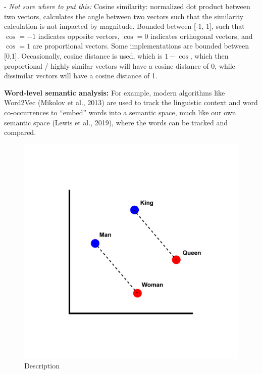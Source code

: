 - \textit{Not sure where to put this:} Cosine similarity: normalized dot product between two vectors, calculates the angle between two vectors such that the similarity calculation is not impacted by magnitude. Bounded between [-1, 1], such that $\cos = -1$ indicates opposite vectors, $\cos = 0$ indicates orthogonal vectors, and $\cos = 1$ are proportional vectors. Some implementations are bounded between [0,1]. Occasionally, cosine distance is used, which is $1 - \cos$, which then proportional / highly similar vectors will have a cosine distance of 0, while dissimilar vectors will have a cosine distance of 1.

\textbf{Word-level semantic analysis:}
For example, modern algorithms like Word2Vec (Mikolov et al., 2013) are used to track the linguistic context and word co-occurrences to ``embed'' words into a semantic space, much like our own semantic space (Lewis et al., 2019), where the words can be tracked and compared. 

\begin{figure}[h]
    \centering
    \includegraphics[scale=.2]{./images/Word_vector_illustration.jpg}
    \caption[Example of word embeddings in a semantic space.]{Description}
    \label{vector_figure}
\end{figure}


